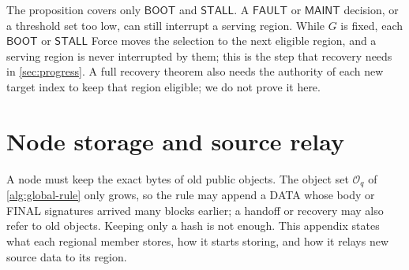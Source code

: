 \documentclass[11pt,a4paper]{article}
\newcommand{\tagg}[1]{\ensuremath{\mathsf{#1}}}
\begin{document}
The proposition covers only \tagg{BOOT} and \tagg{STALL}. A \tagg{FAULT}
or \tagg{MAINT} decision, or a threshold set too low, can still
interrupt a serving region. While $G$ is fixed, each \tagg{BOOT} or
\tagg{STALL} Force moves the selection to the next eligible region, and
a serving region is never interrupted by them; this is the step that
recovery needs in \cref{sec:progress}. A full recovery theorem also needs
the authority of each new target index to keep that region eligible; we
do not prove it here.

\section{Node storage and source relay}
\label{app:storage}
\label{sec:source-step}
\label{sec:source-retention}
A node must keep the exact bytes of old public objects. The object set
$\mathcal O_q$ of \cref{alg:global-rule} only grows, so the rule may
append a DATA whose body or FINAL signatures arrived many blocks
earlier; a handoff or recovery may also refer to old objects. Keeping
only a hash is not enough. This appendix states what each regional member stores, how it starts storing, and how it relays new source data to its region.
\end{document}

